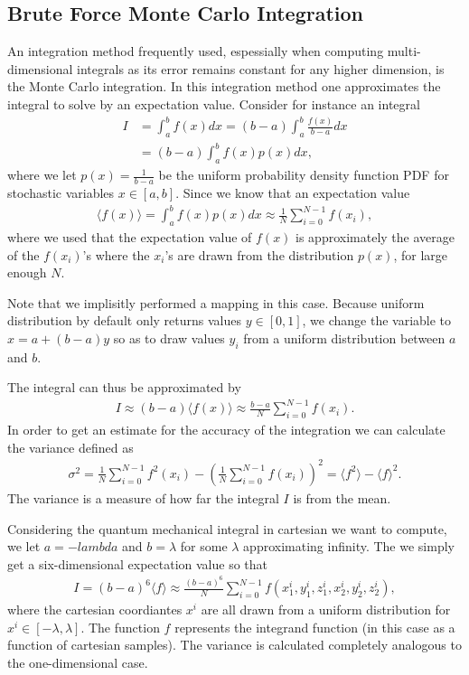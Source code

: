 \documentclass[twocolumn]{aastex62}
\begin{document}
\subsection{Brute Force Monte Carlo Integration}
An integration method frequently used, espessially when computing multi-dimensional integrals as its error remains constant for any higher dimension, is the Monte Carlo integration. In this integration method one approximates the integral to solve by an expectation value. Consider for instance an integral 
\begin{align}
	I &= \int^b_a f(x)dx = (b-a)\int^b_a\frac{f(x)}{b-a}dx \\	
	&= (b-a)\int^b_af(x)p(x)dx,
\end{align}
where we let $p(x) = \frac{1}{b-a}$ be the uniform probability density function PDF for stochastic variables $x\in[a, b]$. Since we know that an expectation value 
\begin{align}
	\langle f(x)\rangle = \int^b_a f(x)p(x)dx \approx \frac{1}{N}\sum_{i=0}^{N-1} f(x_i),
\end{align}
where we used that the expectation value of $f(x)$ is approximately the average of the $f(x_i)$'s where the $x_i$'s are drawn from the distribution $p(x)$, for large enough $N$. 

Note that we implisitly performed a mapping in this case. Because uniform distribution by default only returns values $y\in[0, 1]$, we change the variable to $x = a + (b-a)y$ so as to draw values $y_i$ from a uniform distribution between $a$ and $b$. 

The integral can thus be approximated by 
\begin{align}
	I \approx (b-a)\langle f(x) \rangle \approx \frac{b-a}{N}\sum^{N-1}_{i=0}f(x_i).
\end{align}
In order to get an estimate for the accuracy of the integration we can calculate the variance defined as 
\begin{align}
	\sigma^2 = \frac{1}{N}\sum_{i=0}^{N-1} f^2(x_i) - \left(\frac{1}{N}\sum_{i=0}^{N-1}f(x_i)\right)^2 = \langle f^2\rangle - \langle f\rangle^2.
\end{align}
The variance is a measure of how far the integral $I$ is from the mean.

Considering the quantum mechanical integral in cartesian we want to compute, we let $a=-lambda$ and $b=\lambda$ for some $\lambda$ approximating infinity. The we simply get a six-dimensional expectation value so that 
\begin{align}
	I = (b-a)^6\langle f \rangle \approx \frac{(b-a)^6}{N}\sum^{N-1}_{i=0} f(x_1^i, y_1^i, z_1^i, x_2^i, y_2^i, z_2^i),
\end{align}
where the cartesian coordiantes $x^i$ are all drawn from a uniform distribution for $x^i\in[-\lambda, \lambda]$. The function $f$ represents the integrand function (in this case as a function of cartesian samples). The variance is calculated completely analogous to the one-dimensional case. 
\end{document}
